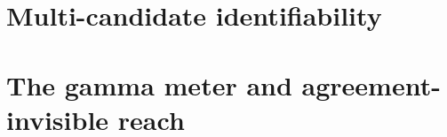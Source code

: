 \section{Multi-candidate identifiability}\label{sec:multicand}
\section{The gamma meter and agreement-invisible reach}\label{sec:gmeter}

